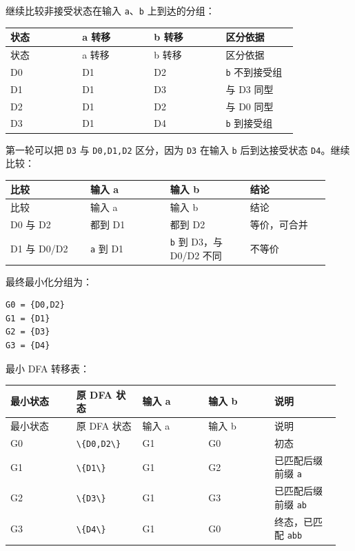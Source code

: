 \documentclass[UTF8]{ctexart}
\begin{document}
继续比较非接受状态在输入 \texttt{a}、\texttt{b} 上到达的分组：

\begin{longtable}{|p{0.23\linewidth}|p{0.23\linewidth}|p{0.23\linewidth}|p{0.23\linewidth}|}
\hline
状态 & a 转移 & b 转移 & 区分依据 \\
\hline
\endfirsthead
状态 & a 转移 & b 转移 & 区分依据 \\
\hline
\endhead
D0 & D1 & D2 & \texttt{b} 不到接受组 \\
\hline
D1 & D1 & D3 & 与 D3 同型 \\
\hline
D2 & D1 & D2 & 与 D0 同型 \\
\hline
D3 & D1 & D4 & \texttt{b} 到接受组 \\
\hline
\end{longtable}

第一轮可以把 \texttt{D3} 与 \texttt{D0,D1,D2} 区分，因为 \texttt{D3} 在输入 \texttt{b} 后到达接受状态 \texttt{D4}。继续比较：

\begin{longtable}{|p{0.23\linewidth}|p{0.23\linewidth}|p{0.23\linewidth}|p{0.23\linewidth}|}
\hline
比较 & 输入 a & 输入 b & 结论 \\
\hline
\endfirsthead
比较 & 输入 a & 输入 b & 结论 \\
\hline
\endhead
D0 与 D2 & 都到 D1 & 都到 D2 & 等价，可合并 \\
\hline
D1 与 D0/D2 & \texttt{a} 到 D1 & \texttt{b} 到 D3，与 D0/D2 不同 & 不等价 \\
\hline
\end{longtable}

最终最小化分组为：

\begin{Verbatim}[fontsize=\small,breaklines=true]
G0 = {D0,D2}
G1 = {D1}
G2 = {D3}
G3 = {D4}
\end{Verbatim}

最小 DFA 转移表：

\begin{longtable}{|p{0.19\linewidth}|p{0.19\linewidth}|p{0.19\linewidth}|p{0.19\linewidth}|p{0.19\linewidth}|}
\hline
最小状态 & 原 DFA 状态 & 输入 a & 输入 b & 说明 \\
\hline
\endfirsthead
最小状态 & 原 DFA 状态 & 输入 a & 输入 b & 说明 \\
\hline
\endhead
G0 & \texttt{\textbackslash{}\{D0,D2\textbackslash{}\}} & G1 & G0 & 初态 \\
\hline
G1 & \texttt{\textbackslash{}\{D1\textbackslash{}\}} & G1 & G2 & 已匹配后缀前缀 \texttt{a} \\
\hline
G2 & \texttt{\textbackslash{}\{D3\textbackslash{}\}} & G1 & G3 & 已匹配后缀前缀 \texttt{ab} \\
\hline
G3 & \texttt{\textbackslash{}\{D4\textbackslash{}\}} & G1 & G0 & 终态，已匹配 \texttt{abb} \\
\hline
\end{longtable}
\end{document}
